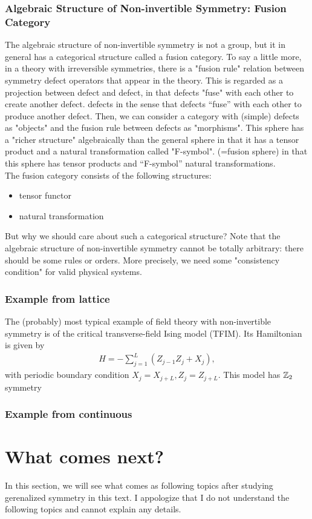 \documentclass{ltjsarticle}
\theoremstyle{mystyle} %
\numberwithin{equation}{section}
\begin{document}
\subsubsection{Algebraic Structure of Non-invertible Symmetry: Fusion Category}
The algebraic structure of non-invertible symmetry is not a group, but it in general has a categorical structure called a fusion category. 
To say a little more, in a theory with irreversible symmetries, there is a "fusion rule" relation between symmetry defect operators that appear in the theory. 
This is regarded as a projection between defect and defect, in that defects "fuse" with each other to create another defect. defects in the sense that defects “fuse” with each other to produce another defect. 
Then, we can consider a category with (simple) defects as "objects" and the fusion rule between defects as "morphisms". 
This sphere has a "richer structure" algebraically than the general sphere 
in that it has a tensor product and a natural transformation called "F-symbol". (=fusion sphere) in that this sphere has tensor products and “F-symbol” natural transformations. 
\\
 The fusion category consists of the following structures: 
\begin{itemize}
    \item tensor functor
    \item natural transformation 
\end{itemize}
 But why we should care about such a categorical structure?
  Note that the algebraic structure of non-invertible symmetry cannot be totally arbitrary: 
  there should be some rules or orders. 
  More precisely, we need some "consistency condition" for valid physical systems. 
\subsubsection{Example from lattice}
The (probably) most typical example of field theory with non-invertible symmetry is 
of the critical transverse-field Ising model (TFIM). Its Hamiltonian is given by
\begin{align}
    H = -\sum_{j=1}^{L}(Z_{j-1}Z_j + X_j), 
\end{align}
with periodic boundary condition $X_j = X_{j+L}, Z_j=Z_{j+L}$. 
This model has $\mathbb{Z}_2$ symmetry
\subsubsection{Example from continuous}
\section{What comes next?}
In this section, we will see what comes as following topics after studying gerenalized symmetry in this text. 
I appologize that I do not understand the following topics and cannot explain any details. 
\end{document}
